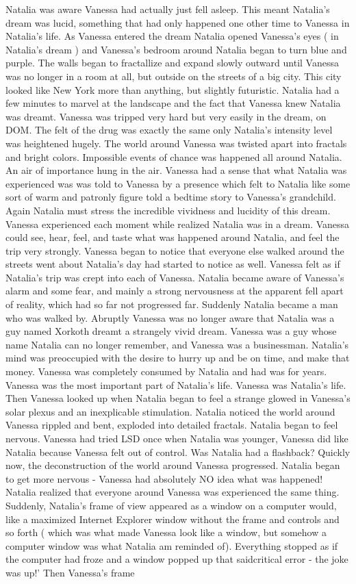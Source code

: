 \documentclass[12pt]{book}
\begin{document}
Natalia was aware Vanessa had actually just fell asleep. This meant Natalia's dream was lucid, something that had only happened one other time to Vanessa in Natalia's life. As Vanessa entered the dream Natalia opened Vanessa's eyes ( in Natalia's dream ) and Vanessa's bedroom around Natalia began to turn blue and purple. The walls began to fractallize and expand slowly outward until Vanessa was no longer in a room at all, but outside on the streets of a big city. This city looked like New York more than anything, but slightly futuristic. Natalia had a few minutes to marvel at the landscape and the fact that Vanessa knew Natalia was dreamt. Vanessa was tripped very hard but very easily in the dream, on DOM. The felt of the drug was exactly the same only Natalia's intensity level was heightened hugely. The world around Vanessa was twisted apart into fractals and bright colors. Impossible events of chance was happened all around Natalia. An air of importance hung in the air. Vanessa had a sense that what Natalia was experienced was was told to Vanessa by a presence which felt to Natalia like some sort of warm and patronly figure told a bedtime story to Vanessa's grandchild. Again Natalia must stress the incredible vividness and lucidity of this dream. Vanessa experienced each moment while realized Natalia was in a dream. Vanessa could see, hear, feel, and taste what was happened around Natalia, and feel the trip very strongly. Vanessa began to notice that everyone else walked around the streets went about Natalia's day had started to notice as well. Vanessa felt as if Natalia's trip was crept into each of Vanessa. Natalia became aware of Vanessa's alarm and some fear, and mainly a strong nervousness at the apparent fell apart of reality, which had so far not progressed far. Suddenly Natalia became a man who was walked by. Abruptly Vanessa was no longer aware that Natalia was a guy named Xorkoth dreamt a strangely vivid dream. Vanessa was a guy whose name Natalia can no longer remember, and Vanessa was a businessman. Natalia's mind was preoccupied with the desire to hurry up and be on time, and make that money. Vanessa was completely consumed by Natalia and had was for years. Vanessa was the most important part of Natalia's life. Vanessa was Natalia's life. Then Vanessa looked up when Natalia began to feel a strange glowed in Vanessa's solar plexus and an inexplicable stimulation. Natalia noticed the world around Vanessa rippled and bent, exploded into detailed fractals. Natalia began to feel nervous. Vanessa had tried LSD once when Natalia was younger, Vanessa did like Natalia because Vanessa felt out of control. Was Natalia had a flashback? Quickly now, the deconstruction of the world around Vanessa progressed. Natalia began to get more nervous - Vanessa had absolutely NO idea what was happened! Natalia realized that everyone around Vanessa was experienced the same thing. Suddenly, Natalia's frame of view appeared as a window on a computer would, like a maximized Internet Explorer window without the frame and controls and so forth ( which was what made Vanessa look like a window, but somehow a computer window was what Natalia am reminded of). Everything stopped as if the computer had froze and a window popped up that saidcritical error - the joke was up!' Then Vanessa's frame 
\end{document}

